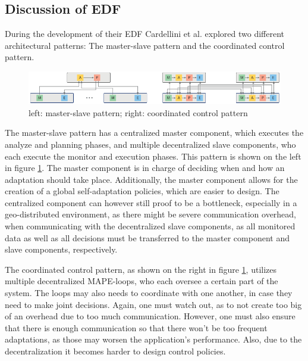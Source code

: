         \subsection{Discussion of EDF}
        \label{sub:discussion-edf}
        During the development of their EDF Cardellini et al. explored two different architectural patterns: The master-slave pattern and the coordinated control pattern.

        \begin{figure}[hbt]
            \centering
            \includegraphics[width=1.0\textwidth]{Bilder/master_coordinated.png}
            \caption{
                    left: master-slave pattern; right: coordinated control pattern\cite{cardellini}
            }
            \label{fig:master_coordinated}
        \end{figure}

        \quad The master-slave pattern has a centralized master component, which executes the analyze and planning phases, and multiple decentralized slave components, 
        who each execute the monitor and execution phases. This pattern is shown on the left in figure \ref{fig:master_coordinated}.
        The master component is in charge of deciding when and how an adaptation should take place.
        Additionally, the master component allows for the creation of a global self-adaptation policies, which are easier to design.
        The centralized component can however still proof to be a bottleneck, especially in a geo-distributed environment, as there might be severe communication overhead, when communicating 
        with the decentralized slave components, as all monitored data as well as all decisions must be transferred to the master component and slave components, respectively. 

        \quad The coordinated control pattern, as shown on the right in figure \ref{fig:master_coordinated}, utilizes multiple decentralized MAPE-loops, who each oversee a certain part of the system. 
        The loops may also needs to coordinate with one another, in case they need to make joint decisions. Again, one must watch out, as to not create too big of an overhead due to too much communication.
        However, one must also ensure that there is enough communication so that there won't be too frequent adaptations, as those may worsen the application's performance.
        Also, due to the decentralization it becomes harder to design control policies.
        
